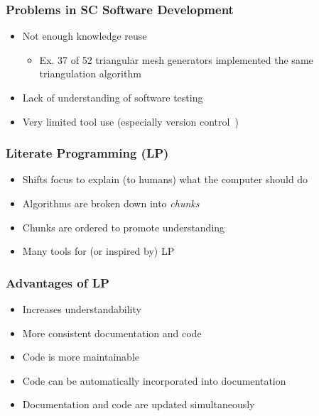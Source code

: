 \documentclass{beamer}
\begin{document}

\begin{frame}
\frametitle{Problems in SC Software Development}

\begin{itemize}
\item Not enough knowledge reuse
\begin{itemize}
\item Ex. 37 of 52 triangular mesh generators implemented the same triangulation
algorithm~\cite{Owen1998}
\end{itemize}
\item Lack of understanding of software testing~\cite{Merali2010}
\item Very limited tool use (especially version control~\cite{Wilson2006})
\end{itemize}

\end{frame}


%
%


\begin{frame}
\frametitle{Literate Programming (LP)}

\begin{itemize}
\item Shifts focus to explain (to humans) what the computer should do~\cite{Knuth1984}
\item Algorithms are broken down into \emph{chunks}~\cite{JohnsonAndJohnson1997}
\item Chunks are ordered to promote understanding
\item Many tools for (or inspired by) LP
\end{itemize}

\end{frame}


\begin{frame}
\frametitle{Advantages of LP}

\begin{itemize}
\item Increases understandability
\item More consistent documentation and code~\cite{ShumAndCook1993}
\item Code is more maintainable~\cite{PieterseKourieAndBoake2004}
\item Code can be automatically incorporated into documentation
\item Documentation and code are updated simultaneously
\end{itemize}

\end{frame}
\end{document}

